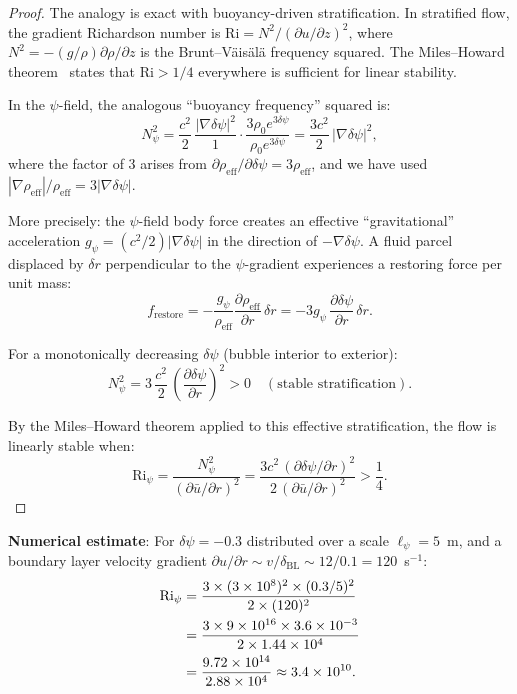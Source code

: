 \documentclass[12pt,twocolumn]{article}
\newcommand{\Reff}{\mathrm{eff}}
\newcommand{\dpsi}{\delta\psi}
\begin{document}
\begin{proof}
The analogy is exact with buoyancy-driven stratification.
In stratified flow, the gradient Richardson number is
$\mathrm{Ri} = N^2/(\partial u/\partial z)^2$, where $N^2 =
-(g/\rho)\partial\rho/\partial z$ is the Brunt--V\"ais\"al\"a frequency
squared. The Miles--Howard theorem~\cite{miles1961,howard1961} states
that $\mathrm{Ri} > 1/4$ everywhere is sufficient for linear stability.

In the $\psi$-field, the analogous ``buoyancy frequency'' squared is:
\begin{equation}
N_\psi^2 = \frac{c^2}{2}\,\frac{|\nabla\dpsi|^2}{1}
\cdot\frac{3\rho_0 e^{3\dpsi}}{\rho_0 e^{3\dpsi}}
= \frac{3c^2}{2}\,|\nabla\dpsi|^2,
\end{equation}
where the factor of 3 arises from $\partial\rho_\Reff/\partial\dpsi =
3\rho_\Reff$, and we have used $|\nabla\rho_\Reff|/\rho_\Reff =
3|\nabla\dpsi|$.

More precisely: the $\psi$-field body force creates an effective
``gravitational'' acceleration $g_\psi = (c^2/2)|\nabla\dpsi|$ in the
direction of $-\nabla\dpsi$. A fluid parcel displaced by $\delta r$
perpendicular to the $\psi$-gradient experiences a restoring force per
unit mass:
\begin{equation}
f_\mathrm{restore} = -\frac{g_\psi}{\rho_\Reff}
\frac{\partial\rho_\Reff}{\partial r}\,\delta r
= -3 g_\psi\,\frac{\partial\dpsi}{\partial r}\,\delta r.
\end{equation}

For a monotonically decreasing $\dpsi$ (bubble interior to exterior):
\begin{equation}
N_\psi^2 = 3\,\frac{c^2}{2}\,\left(\frac{\partial\dpsi}{\partial r}\right)^2
> 0 \quad (\text{stable stratification}).
\end{equation}

By the Miles--Howard theorem applied to this effective stratification,
the flow is linearly stable when:
\begin{equation}
\mathrm{Ri}_\psi = \frac{N_\psi^2}{(\partial\bar{u}/\partial r)^2}
= \frac{3c^2\,(\partial\dpsi/\partial r)^2}
{2\,(\partial\bar{u}/\partial r)^2} > \frac{1}{4}.
\end{equation}
\end{proof}

\textbf{Numerical estimate}: For $\dpsi = -0.3$ distributed over a scale
$\ell_\psi = 5$~m, and a boundary layer velocity gradient $\partial u/
\partial r \sim v/\delta_\mathrm{BL} \sim 12/0.1 = 120$~s$^{-1}$:
\begin{align}
\mathrm{Ri}_\psi &= \frac{3 \times (3\times10^8)^2 \times (0.3/5)^2}
{2 \times (120)^2} \notag\\
&= \frac{3 \times 9\times10^{16} \times 3.6\times10^{-3}}
{2 \times 1.44\times10^4} \notag\\
&= \frac{9.72\times10^{14}}{2.88\times10^4}
\approx 3.4\times10^{10}.
\end{align}
\end{document}
